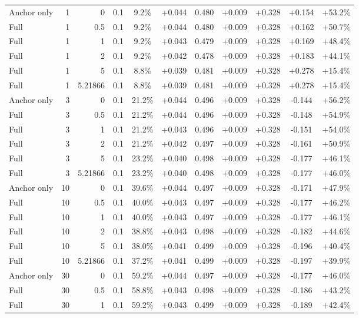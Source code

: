 \begin{table}[htbp]
\begin{tabular}{lrrrccccccc}
Anchor only & 1 & 0 & 0.1 & 9.2\% & +0.044 & 0.480 & +0.009 & +0.328 & +0.154 & +53.2\% \\
Full & 1 & 0.5 & 0.1 & 9.2\% & +0.044 & 0.480 & +0.009 & +0.328 & +0.162 & +50.7\% \\
Full & 1 & 1 & 0.1 & 9.2\% & +0.043 & 0.479 & +0.009 & +0.328 & +0.169 & +48.4\% \\
Full & 1 & 2 & 0.1 & 9.2\% & +0.042 & 0.478 & +0.009 & +0.328 & +0.183 & +44.1\% \\
Full & 1 & 5 & 0.1 & 8.8\% & +0.039 & 0.481 & +0.009 & +0.328 & +0.278 & +15.4\% \\
Full & 1 & 5.21866 & 0.1 & 8.8\% & +0.039 & 0.481 & +0.009 & +0.328 & +0.278 & +15.4\% \\
Anchor only & 3 & 0 & 0.1 & 21.2\% & +0.044 & 0.496 & +0.009 & +0.328 & -0.144 & +56.2\% \\
Full & 3 & 0.5 & 0.1 & 21.2\% & +0.044 & 0.496 & +0.009 & +0.328 & -0.148 & +54.9\% \\
Full & 3 & 1 & 0.1 & 21.2\% & +0.043 & 0.496 & +0.009 & +0.328 & -0.151 & +54.0\% \\
Full & 3 & 2 & 0.1 & 21.2\% & +0.042 & 0.497 & +0.009 & +0.328 & -0.161 & +50.9\% \\
Full & 3 & 5 & 0.1 & 23.2\% & +0.040 & 0.498 & +0.009 & +0.328 & -0.177 & +46.1\% \\
Full & 3 & 5.21866 & 0.1 & 23.2\% & +0.040 & 0.498 & +0.009 & +0.328 & -0.177 & +46.0\% \\
Anchor only & 10 & 0 & 0.1 & 39.6\% & +0.044 & 0.497 & +0.009 & +0.328 & -0.171 & +47.9\% \\
Full & 10 & 0.5 & 0.1 & 40.0\% & +0.043 & 0.497 & +0.009 & +0.328 & -0.177 & +46.2\% \\
Full & 10 & 1 & 0.1 & 40.0\% & +0.043 & 0.497 & +0.009 & +0.328 & -0.177 & +46.1\% \\
Full & 10 & 2 & 0.1 & 38.8\% & +0.043 & 0.498 & +0.009 & +0.328 & -0.182 & +44.6\% \\
Full & 10 & 5 & 0.1 & 38.0\% & +0.041 & 0.499 & +0.009 & +0.328 & -0.196 & +40.4\% \\
Full & 10 & 5.21866 & 0.1 & 37.2\% & +0.041 & 0.499 & +0.009 & +0.328 & -0.197 & +39.9\% \\
Anchor only & 30 & 0 & 0.1 & 59.2\% & +0.044 & 0.497 & +0.009 & +0.328 & -0.177 & +46.0\% \\
Full & 30 & 0.5 & 0.1 & 58.8\% & +0.043 & 0.498 & +0.009 & +0.328 & -0.186 & +43.2\% \\
Full & 30 & 1 & 0.1 & 59.2\% & +0.043 & 0.499 & +0.009 & +0.328 & -0.189 & +42.4\% \\

\end{tabular}
\end{table}
